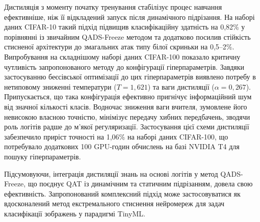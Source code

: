 \documentclass{pma-mthesis}
\begin{document}
Дистиляція з моменту початку тренування стабілізує процес навчання ефективніше, ніж її відкладений запуск після динамічного підрізання. На наборі даних CIFAR-10 такий підхід підвищив класифікаційну здатність на 0,82\% у порівнянні із звичайним QADS-Freeze методом та додатково посилив стійкість стисненої архітектури до змагальних атак типу білої скриньки на 0,5--2\%. Випробування на складнішому наборі даних CIFAR-100 показало критичну чутливість запропонованого методу до конфігурації гіперпараметрів. Завдяки застосуванню беєсівської оптимізації до цих гіперпараметрів виявлено потребу в нетиповому зниженні температури ($T = 1,621$) та ваги дистиляції ($\alpha=0,267$). Припускається, що така конфігурація ефективно пригнічує інформаційний шум від значної кількості класів. Водночас зниження ваги вчителя, зумовлене його невисокою власною точністю, мінімізує передачу хибних передбачень, зводячи роль логітів радше до м'якої регуляризації. Застосування цієї схеми дистиляції забезпечило приріст точності на 1,06\% на наборі даних CIFAR-100, що потребувало додаткових 100 GPU-годин обчислень на базі NVIDIA T4 для пошуку гіперпараметрів.

Підсумовуючи, інтеграція дистиляції знань на основі логітів у метод QADS-Freeze, що поєднує QAT із динамічним та статичним підрізанням, довела свою ефективність. Запропонований комплексний підхід може застосовуватися як вдосконалений метод екстремального стиснення нейромереж для задач класифікації зображень у парадигмі TinyML.
\end{document}
